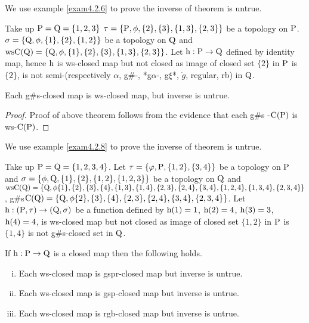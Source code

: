 We use example \ref{exam4.2.6} to prove the inverse of theorem is untrue.

\begin{exm}\label{exam4.2.6}
Take up $\mathrm{P} = \mathrm{Q} = \{1, 2, 3\}$ $\tau = \{\mathrm{P}, \phi, \{2\}, \{3\},\{1,3\},\{2, 3\}\}$ be a topology on $\mathrm{P}$. $\sigma =\{\mathrm{Q}, \phi, \{1\}, \{2\}, \{1, 2\}\}$ be a topology on $\mathrm{Q}$ and $\mathrm{ws}\mathrm{C}(\mathrm{Q})=\{\mathrm{Q}, \phi,\{1\},\{2\},\{3\},\{1,3\},\{2,3\}\}$. Let $\mathrm{h}: \mathrm{P} \to \mathrm{Q}$ defined by identity map, hence $\mathrm{h}$ is ws-closed map but not closed as image of closed set $\{2\}$ in $\mathrm{P}$ is $\{2\}$, is not semi-(respectively $\alpha$, g\#-, *g$\alpha$-, g$\xi$*, $\ddot{g}$, regular, rb) in $\mathrm{Q}$.
\end{exm}

\begin{thm}\label{thm4.2.7}
Each g\#s-closed map is ws-closed map, but inverse is untrue.
\end{thm}

\begin{proof}
Proof of above theorem follows from the evidence that each g\#s -$\mathrm{C}(\mathrm{P})$ is ws-$\mathrm{C}(\mathrm{P})$.
\end{proof}

We use example \ref{exam4.2.8} to prove the inverse of theorem is untrue.

\begin{exm}\label{exam4.2.8}
Take up $\mathrm{P}=\mathrm{Q}= \{1, 2, 3, 4\}$. Let $\tau= \{\varphi, \mathrm{P}, \{1,2\}, \{3,4\}\}$ be a topology on $\mathrm{P}$ and $\sigma=\{\phi, \mathrm{Q}, \{1\}, \{2\}, \{1, 2\},\{1,2,3\}\}$ be a topology on $\mathrm{Q}$ and $\ws\TSC(\TSQ)=\{\TSQ, \phi \{1\},\{2\},\{3\},\{4\},\{1,3\}, \{1,4\},\{2,3\},\{2,4\},\{3,4\},\{1,2,4\}, \{1,3,4\},\break \{2,3,4\}\}$, g\#s$\mathrm{C}(\mathrm{Q})=\{\mathrm{Q}, \phi \{2\},\{3\},\{4\},\{2,3\},\{2,4\},\{3,4\},\{2,3,4\}\}$. Let $\TSh: (\TSP, \tau )\break \to (\TSQ, \sigma)$ be a function defined by $\mathrm{h}(1)= 1$, $\mathrm{h}(2)=4$, $\mathrm{h}(3)=3$, $\mathrm{h}(4)=4$, is ws-closed map but not closed as image of closed set $\{1,2\}$ in $\mathrm{P}$ is $\{1,4\}$ is not g\#s-closed set in $\mathrm{Q}$.
\end{exm}

\begin{thm}\label{thm4.2.9}
If $\mathrm{h}: \mathrm{P}\to \mathrm{Q}$ is a closed map then the following holds.
\begin{enumerate}[(i)]
\item Each ws-closed map is gspr-closed map but inverse is untrue.
\item Each ws-closed map is gsp-closed map but inverse is untrue.
\item Each ws-closed map is rgb-closed map but inverse is untrue.
\end{enumerate}
\end{thm}

